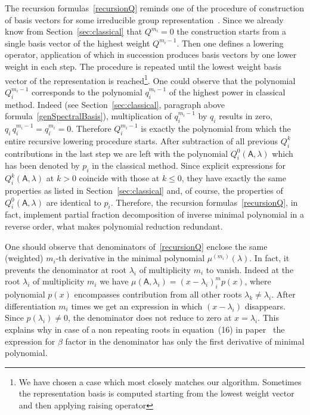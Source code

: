 \documentclass[AMA,STIX1COL]{WileyNJD-v2}
\def\m#1{\mathsf{#1}} %
\def\m#1{\mathsf{#1}}%
\begin{document}
\begin{remark}
 The recursion formulas~\eqref{recursionQ} reminds one of the procedure of construction of
  basis vectors for some irreducible group representation~\cite{Georgi2000}.
 Since we already know from Section~\ref{sec:classical} that $Q^{m_i}=0$
 the construction starts from a single basis vector of the highest weight $Q^{m_i-1}$.
 Then one defines a lowering operator,  application of which in succession produces basis vectors
 by one lower weight in each step. The procedure is repeated until the lowest weight basis vector of the
 representation is reached\footnote{We have chosen a case which most closely matches our algorithm.
 Sometimes the representation basis is computed starting from the lowest weight vector  and then
 applying raising operator}. One could observe
 that the polynomial $Q_i^{m_i-1}$ corresponds to the polynomial $q_i^{m_i-1}$ of the highest
 power in classical method.
 Indeed  (see Section~\ref{sec:classical}, paragraph above formula~\eqref{genSpectralBasis}), multiplication of $q_i^{m_i-1}$
 by $q_i$ results in zero, $q_i\,q_i^{m_i-1}=q_i^{m_i}=0$. Therefore $Q_i^{m_i-1}$ is exactly the polynomial from which
 the entire recursive lowering procedure starts. After subtraction of all previous $Q_i^k$ contributions in the last step
 we are left with the polynomial $Q_i^{0}(\m{A},\lambda)$ which has been denoted by $p_i$ in the classical method.
 Since explicit expressions for $Q_i^{k}(\m{A},\lambda)$ at $k>0$ coincide with those at $k\le 0$, they
 have exactly the same properties
 as listed in Section~\ref{sec:classical}  and, of course, the properties of $Q_i^{0}(\m{A},\lambda)$ are identical to $p_i$.
 Therefore, the recursion formulas~\eqref{recursionQ}, in fact, implement partial fraction decomposition
 of inverse minimal polynomial in a reverse order, what makes polynomial reduction redundant.
\end{remark}

\begin{remark}[Denominators]
  One should observe that denominators of~\eqref{recursionQ} enclose the same (weighted) $m_i$-th derivative
  in the  minimal polynomial $\mu^{(m_i)}(\lambda)$. In fact, it prevents the denominator at root $\lambda_i$ of
  multiplicity $m_i$ to vanish.
  Indeed at the root $\lambda_i$ of multiplicity $m_i$ we have
  $\mu(\m{A},\lambda_i)=(x-\lambda_i)^m_i p(x)$, where polynomial $p(x)$ encompasses contribution from
  all other roots $\lambda_k\neq\lambda_i$.  After differentiation $m_i$ times we get an expression
  in which $(x-\lambda_i)$ disappears. Since $p(\lambda_i)\neq 0$, the denominator does not reduce to zero
  at $x=\lambda_i$. This explains why in case of a non repeating roots in equation~(16)
  in paper~\cite{AcusMMAS2023} the expression for $\beta$ factor in the denominator has only the  first derivative of
  minimal polynomial.
\end{remark}
\end{document}
